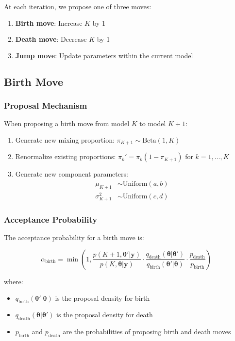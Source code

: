 \documentclass[12pt]{article}
\begin{document}
At each iteration, we propose one of three moves:

\begin{enumerate}
\item \textbf{Birth move}: Increase $K$ by 1
\item \textbf{Death move}: Decrease $K$ by 1  
\item \textbf{Jump move}: Update parameters within the current model
\end{enumerate}

\subsection{Birth Move}

\subsubsection{Proposal Mechanism}

When proposing a birth move from model $K$ to model $K+1$:

\begin{enumerate}
\item Generate new mixing proportion: $\pi_{K+1} \sim \text{Beta}(1, K)$
\item Renormalize existing proportions: $\pi_k' = \pi_k(1 - \pi_{K+1})$ for $k = 1, \ldots, K$
\item Generate new component parameters:
\begin{align}
\mu_{K+1} &\sim \text{Uniform}(a, b) \\
\sigma_{K+1}^2 &\sim \text{Uniform}(c, d)
\end{align}
\end{enumerate}

\subsubsection{Acceptance Probability}

The acceptance probability for a birth move is:

\begin{equation}
\alpha_{\text{birth}} = \min\left(1, \frac{p(K+1, \boldsymbol{\theta}'|\mathbf{y})}{p(K, \boldsymbol{\theta}|\mathbf{y})} \cdot \frac{q_{\text{death}}(\boldsymbol{\theta}|\boldsymbol{\theta}')}{q_{\text{birth}}(\boldsymbol{\theta}'|\boldsymbol{\theta})} \cdot \frac{p_{\text{death}}}{p_{\text{birth}}}\right)
\end{equation}

where:
\begin{itemize}
\item $q_{\text{birth}}(\boldsymbol{\theta}'|\boldsymbol{\theta})$ is the proposal density for birth
\item $q_{\text{death}}(\boldsymbol{\theta}|\boldsymbol{\theta}')$ is the proposal density for death
\item $p_{\text{birth}}$ and $p_{\text{death}}$ are the probabilities of proposing birth and death moves
\end{itemize}
\end{document}
